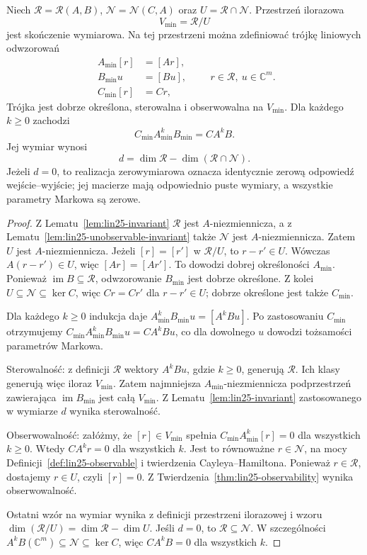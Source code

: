 \begin{twierdzenie}
\label{thm:lin27-reduction}
Niech
\(\mathcal R=\mathcal R(A,B)\),
\(\mathcal N=\mathcal N(C,A)\)
oraz \(U=\mathcal R\cap\mathcal N\).
Przestrzeń ilorazowa
\[
 V_{\min}=\mathcal R/U
\]
jest skończenie wymiarowa.
Na tej przestrzeni
można zdefiniować
trójkę liniowych odwzorowań
\[
 \begin{aligned}
 A_{\min}[r]&=[Ar],\\
 B_{\min}u&=[Bu],\\
 C_{\min}[r]&=Cr,
 \end{aligned}
 \qquad
 r\in\mathcal R,\ u\in\mathbb C^m.
\]
Trójka jest dobrze określona,
sterowalna i obserwowalna
na \(V_{\min}\).
Dla każdego \(k\ge0\)
zachodzi
\[
 C_{\min}A_{\min}^kB_{\min}
 =CA^kB.
\]
Jej wymiar wynosi
\[
 d=\dim\mathcal R
       -\dim(\mathcal R\cap\mathcal N).
\]
Jeżeli \(d=0\), to
realizacja zerowymiarowa
oznacza identycznie zerową
odpowiedź wejście--wyjście;
jej macierze mają odpowiednio
puste wymiary, a wszystkie
parametry Markowa są zerowe.
\end{twierdzenie}
\begin{proof}
Z
Lematu~\ref{lem:lin25-invariant}
\(\mathcal R\) jest
\(A\)-niezmiennicza,
a z
Lematu~\ref{lem:lin25-unobservable-invariant}
także \(\mathcal N\)
jest \(A\)-niezmiennicza.
Zatem \(U\) jest
\(A\)-niezmiennicza.
Jeżeli \([r]=[r']\)
w \(\mathcal R/U\),
to \(r-r'\in U\).
Wówczas
\(A(r-r')\in U\),
więc \([Ar]=[Ar']\).
To dowodzi dobrej
określoności \(A_{\min}\).
Ponieważ
\(\operatorname{im}B\subseteq\mathcal R\),
odwzorowanie \(B_{\min}\)
jest dobrze określone.
Z kolei \(U\subseteq\mathcal N
\subseteq\ker C\),
więc \(Cr=Cr'\)
dla \(r-r'\in U\);
dobrze określone jest
także \(C_{\min}\).

Dla każdego \(k\ge0\)
indukcja daje
\(A_{\min}^kB_{\min}u
 =[A^kBu]\).
Po zastosowaniu \(C_{\min}\)
otrzymujemy
\(C_{\min}A_{\min}^kB_{\min}u
 =CA^kBu\),
co dla dowolnego \(u\)
dowodzi tożsamości
parametrów Markowa.

Sterowalność:
z definicji \(\mathcal R\)
wektory \(A^kBu\),
gdzie \(k\ge0\),
generują \(\mathcal R\).
Ich klasy generują
więc iloraz \(V_{\min}\).
Zatem najmniejsza
\(A_{\min}\)-niezmiennicza
podprzestrzeń zawierająca
\(\operatorname{im}B_{\min}\)
jest całą \(V_{\min}\).
Z
Lematu~\ref{lem:lin25-invariant}
zastosowanego w wymiarze \(d\)
wynika sterowalność.

Obserwowalność:
załóżmy, że
\([r]\in V_{\min}\)
spełnia
\(C_{\min}A_{\min}^k[r]=0\)
dla wszystkich \(k\ge0\).
Wtedy \(CA^kr=0\)
dla wszystkich \(k\).
Jest to równoważne
\(r\in\mathcal N\),
na mocy
Definicji~\ref{def:lin25-observable}
i twierdzenia Cayleya--Hamiltona.
Ponieważ \(r\in\mathcal R\),
dostajemy \(r\in U\),
czyli \([r]=0\).
Z
Twierdzenia~\ref{thm:lin25-observability}
wynika obserwowalność.

Ostatni wzór na wymiar
wynika z definicji
przestrzeni ilorazowej
i wzoru
\(\dim(\mathcal R/U)
 =\dim\mathcal R-\dim U\).
Jeśli \(d=0\),
to \(\mathcal R\subseteq\mathcal N\).
W szczególności
\(A^kB(\mathbb C^m)\subseteq
 \mathcal N\subseteq\ker C\),
więc \(CA^kB=0\)
dla wszystkich \(k\).
\end{proof}

